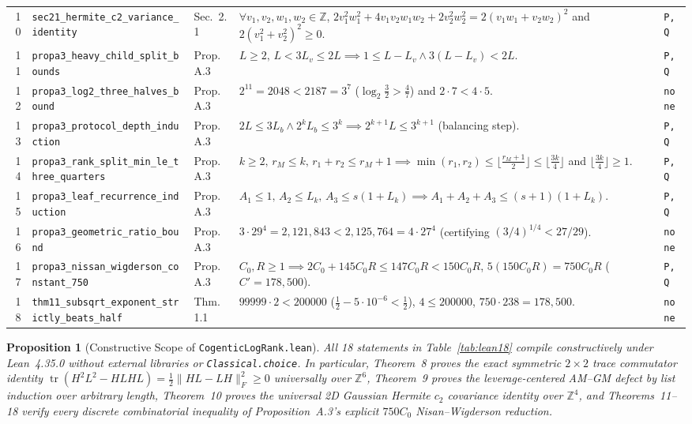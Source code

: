 \documentclass[10pt,twocolumn]{article}
\newtheorem{proposition}{Proposition}
\newcommand{\ZZ}{\mathbb{Z}}
\begin{document}
\begin{table}[t]
\begin{tabular}{@{}r l l p{9.8cm} l@{}}
10 & \texttt{sec21\_hermite\_c2\_variance\_identity} & Sec.~2.1 & $\forall v_1,v_2,w_1,w_2\in\ZZ$, $2v_1^2 w_1^2{+}4v_1 v_2 w_1 w_2{+}2v_2^2 w_2^2 = 2(v_1 w_1{+}v_2 w_2)^2$ and $2(v_1^2{+}v_2^2)^2\ge 0$. & \texttt{P,Q} \\
11 & \texttt{propa3\_heavy\_child\_split\_bounds} & Prop.~A.3 & $L\ge 2,\,L<3L_v\le 2L \implies 1\le L{-}L_v \wedge 3(L{-}L_v)<2L$. & \texttt{P,Q} \\
12 & \texttt{propa3\_log2\_three\_halves\_bound} & Prop.~A.3 & $2^{11} = 2048 < 2187 = 3^7$ ($\log_2\frac32 > \frac47$) and $2\cdot 7 < 4\cdot 5$. & \texttt{none} \\
13 & \texttt{propa3\_protocol\_depth\_induction} & Prop.~A.3 & $2L\le 3L_b \wedge 2^k L_b \le 3^k \implies 2^{k+1} L \le 3^{k+1}$ (balancing step). & \texttt{P,Q} \\
14 & \texttt{propa3\_rank\_split\_min\_le\_three\_quarters} & Prop.~A.3 & $k\ge 2,\,r_M\le k,\,r_1{+}r_2\le r_M{+}1 \implies \min(r_1,r_2)\le \lfloor\frac{r_M+1}{2}\rfloor\le \lfloor\frac{3k}{4}\rfloor$ and $\lfloor\frac{3k}{4}\rfloor\ge 1$. & \texttt{P,Q} \\
15 & \texttt{propa3\_leaf\_recurrence\_induction} & Prop.~A.3 & $A_1\le 1,\,A_2\le L_k,\,A_3\le s(1{+}L_k) \implies A_1{+}A_2{+}A_3\le (s{+}1)(1{+}L_k)$. & \texttt{P,Q} \\
16 & \texttt{propa3\_geometric\_ratio\_bound} & Prop.~A.3 & $3\cdot 29^4 = 2{,}121{,}843 < 2{,}125{,}764 = 4\cdot 27^4$ (certifying $(3/4)^{1/4} < 27/29$). & \texttt{none} \\
17 & \texttt{propa3\_nissan\_wigderson\_constant\_750} & Prop.~A.3 & $C_0,R\ge 1 \implies 2C_0{+}145C_0 R \le 147C_0 R < 150C_0 R$, $5(150 C_0 R){=}750 C_0 R$ ($C'{=}178{,}500$). & \texttt{P,Q} \\
18 & \texttt{thm11\_subsqrt\_exponent\_strictly\_beats\_half} & Thm.~1.1 & $99999\cdot 2 < 200000$ ($\frac12 - 5\cdot 10^{-6} < \frac12$), $4\le 200000$, $750\cdot 238 = 178{,}500$. & \texttt{none} \\
\bottomrule
\end{tabular}
\end{table}

\begin{proposition}[Constructive Scope of \nolinkurl{CogenticLogRank.lean}]\label{prop:lean}
\normalfont All 18 statements in Table~\ref{tab:lean18} compile constructively under Lean~4.35.0 without external libraries or \texttt{Classical.choice}. In particular, Theorem~8 proves the exact symmetric $2\times 2$ trace commutator identity $\operatorname{tr}(H^2 L^2 - HLHL) = \frac12\|HL-LH\|_F^2\ge 0$ universally over $\ZZ^6$, Theorem~9 proves the leverage-centered AM--GM defect by list induction over arbitrary length, Theorem~10 proves the universal 2D Gaussian Hermite $c_2$ covariance identity over $\ZZ^4$, and Theorems~11--18 verify every discrete combinatorial inequality of Proposition~A.3's explicit $750 C_0$ Nisan--Wigderson reduction.
\end{proposition}
\end{document}
